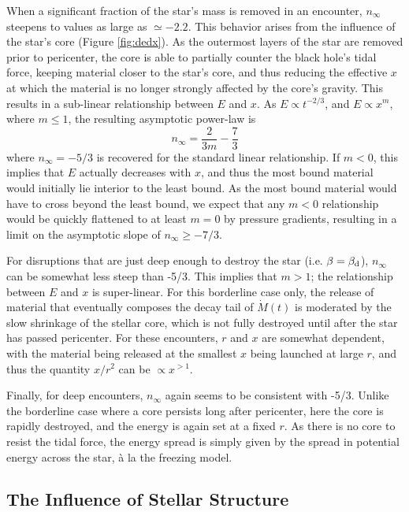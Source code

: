 \documentclass[twocolumn]{emulateapj}
\newcommand{\md}{\dot{M}\left(t\right)}
\newcommand{\ninf}{n_{\infty}}
\begin{document}
When a significant fraction of the star's mass is removed in an encounter, $\ninf$ steepens to values as large as $\simeq -2.2$. This behavior arises from the influence of the star's core (Figure \ref{fig:dedx}). As the outermost layers of the star are removed prior to pericenter, the core is able to partially counter the black hole's tidal force, keeping material closer to the star's core, and thus reducing the effective $x$ at which the material is no longer strongly affected by the core's gravity. This results in a sub-linear relationship between $E$ and $x$. As $E \propto t^{-2/3}$, and $E \propto x^{m}$, where $m \leq 1$, the resulting asymptotic power-law is
\begin{equation}
\ninf = \frac{2}{3m}-\frac{7}{3}
\end{equation}
where $\ninf = -5/3$ is recovered for the standard linear relationship. If $m < 0$, this implies that $E$ actually decreases with $x$, and thus the most bound material would initially lie interior to the least bound. As the most bound material would have to cross beyond the least bound, we expect that any $m < 0$ relationship would be quickly flattened to at least $m = 0$ by pressure gradients, resulting in a limit on the asymptotic slope of $\ninf \geq -7/3$.

For disruptions that are just deep enough to destroy the star (i.e. $\beta = \beta_{\rm d}$), $\ninf$ can be somewhat less steep than -5/3. This implies that $m > 1$; the relationship between $E$ and $x$ is super-linear. For this borderline case only, the release of material that eventually composes the decay tail of $\md$ is moderated by the slow shrinkage of the stellar core, which is not fully destroyed until after the star has passed pericenter. For these encounters, $r$ and $x$ are somewhat dependent, with the material being released at the smallest $x$ being launched at large $r$, and thus the quantity $x/r^{2}$ can be $\propto x^{> 1}$.

Finally, for deep encounters, $\ninf$ again seems to be consistent with -5/3. Unlike the borderline case where a core persists long after pericenter, here the core is rapidly destroyed, and the energy is again set at a fixed $r$. As there is no core to resist the tidal force, the energy spread is simply given by the spread in potential energy across the star,  \`a la the freezing model.

\subsection{The Influence of Stellar Structure}\label{sec:structure}
\end{document}
